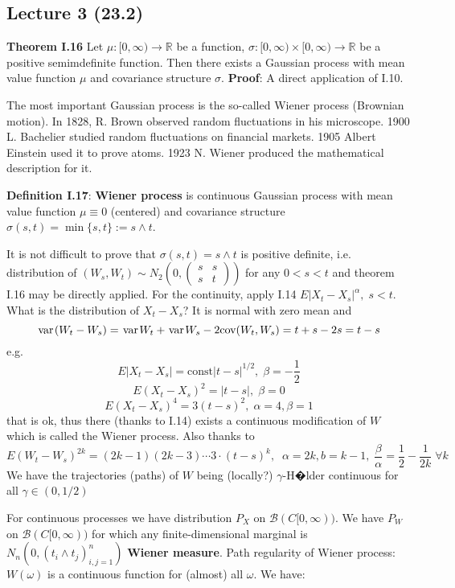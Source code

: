 \documentclass[english]{article}
\newcommand{\R}{\mathbb{R}}
\newcommand{\var}{\hspace{0.1em}\mathrm {var}\hspace{0.1em}}
\newcommand{\note}[1]{\noindent\textbf{#1}}
\newcommand{\B}{\mathcal B}
\begin{document}
\subsection*{Lecture 3 (23.2)}
\note{Theorem I.16} Let $\mu:[0,\infty)\to \R$ be a function, $\sigma:[0,\infty)\times [0,\infty) \to \R$ be a positive semimdefinite function. Then there exists a Gaussian process with mean value function $\mu$ and covariance structure $\sigma$. \newline
\textbf{Proof}: A direct application of I.10. \newline

The most important Gaussian process is the so-called Wiener process (Brownian motion). In 1828, R. Brown observed random fluctuations in his microscope. 1900 L. Bachelier studied random fluctuations on financial markets. 1905 Albert Einstein used it to prove atoms. 1923 N. Wiener produced the mathematical description for it.\newline

\note{Definition I.17}: \textbf{Wiener process} is continuous Gaussian process with mean value function $\mu \equiv 0$ (centered) and covariance structure $\sigma(s,t) = \min \{s,t\}:=s\wedge t$. \newline

It is not difficult to prove that $\sigma(s,t) = s\wedge t$ is positive definite, i.e. distribution of $(W_s, W_t) \sim N_2 ( 0 , \begin{pmatrix} s & s \\ s & t \end{pmatrix} )$ for any $0< s <t$ and theorem I.16 may be directly applied. For the continuity, apply I.14\newline
$E|X_t - X_s|^\alpha,\;  s<t$. What is the distribution of $X_t - X_s$? It is normal with zero mean and 
$$\var (W_t - W_s) = \var W_t + \var W_s - 2\text{cov} (W_t, W_s) = t+ s - 2s = t-s$$
e.g.
$$E|X_t - X_s| = \text{const} |t-s|^{1/2},\; \beta= -\frac 12$$
$$E(X_t - X_s)^2 = |t-s|,\; \beta = 0$$
$$E(X_t - X_s)^4 = 3(t-s)^2,\; \alpha = 4, \beta = 1$$
that is ok, thus there (thanks to I.14) exists a continuous modification of $W$ which is called the Wiener process. Also thanks to 
$$E(W_t -W_s)^{2k} = (2k-1)(2k-3) \cdots 3 \cdot (t-s)^k,\;\; \alpha = 2k, b= k-1, \; \frac{\beta}{\alpha} = \frac 12 - \frac 1{2k}\; \forall k$$
We have the trajectories (paths) of $W$ being (locally?) $\gamma$-H�lder continuous for all $\gamma \in (0,1/2 )$\newline

For continuous processes we have distribution $P_X$ on $\B(C[0,\infty))$. We have $P_W$ on $\B(C[0,\infty))$ for which any finite-dimensional marginal is $N_n(0, (t_i \wedge t_j)^n_{i,j=1})$ \textbf{Wiener measure}.\newline
Path regularity of Wiener process: $W(\omega)$ is a continuous function for (almost) all $\omega$. We have: \newline
\end{document}
